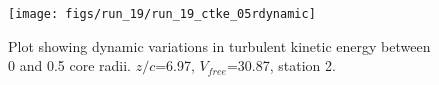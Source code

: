 \begin{figure}[H]
\centering
\texttt{[image: figs/run\_19/run\_19\_ctke\_05rdynamic]}
\caption{Plot showing dynamic variations in turbulent kinetic energy between 0 and 0.5 core radii. $z/c$=6.97, $V_{free}$=30.87, station 2.}
\label{fig:run_19_ctke_05rdynamic}
\end{figure}


